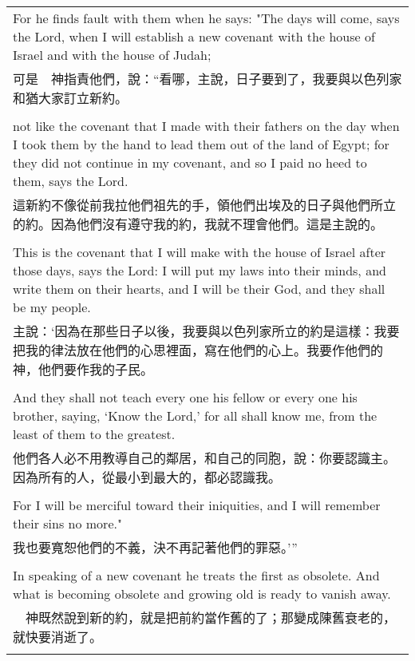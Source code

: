 \documentclass{book}
\begin{document}
\begin{tabularx}{\textwidth}{p{}}
For he finds fault with them when he says:  "The days will come, says the Lord, when I will establish a new covenant with the house of Israel and with the house of Judah; \\
可是　神指責他們，說：“看哪，主說，日子要到了，我要與以色列家和猶大家訂立新約。 \\ \\
not like the covenant that I made with their fathers on the day when I took them by the hand to lead them out of the land of Egypt; for they did not continue in my covenant, and so I paid no heed to them, says the Lord. \\
這新約不像從前我拉他們祖先的手，領他們出埃及的日子與他們所立的約。因為他們沒有遵守我的約，我就不理會他們。這是主說的。 \\ \\
This is the covenant that I will make with the house of Israel after those days, says the Lord: I will put my laws into their minds, and write them on their hearts, and I will be their God, and they shall be my people. \\
主說：‘因為在那些日子以後，我要與以色列家所立的約是這樣：我要把我的律法放在他們的心思裡面，寫在他們的心上。我要作他們的　神，他們要作我的子民。 \\ \\
And they shall not teach every one his fellow or every one his brother, saying, `Know the Lord,' for all shall know me, from the least of them to the greatest. \\
他們各人必不用教導自己的鄰居，和自己的同胞，說：你要認識主。因為所有的人，從最小到最大的，都必認識我。 \\ \\
For I will be merciful toward their iniquities, and I will remember their sins no more." \\
我也要寬恕他們的不義，決不再記著他們的罪惡。’” \\ \\
In speaking of a new covenant he treats the first as obsolete. And what is becoming obsolete and growing old is ready to vanish away. \\
　神既然說到新的約，就是把前約當作舊的了；那變成陳舊衰老的，就快要消逝了。 \\ \\

\hline
\end{tabularx}
\end{document}
